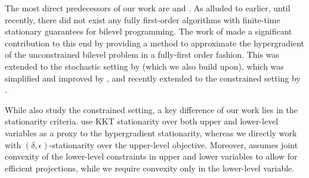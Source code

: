 The most direct predecessors of our work are \cite{liu2021value, kwon2023fully} and \cite{yao2024constrained, lu2024firstorder}. As alluded to earlier, until recently, there did not exist any fully first-order algorithms with finite-time stationary guarantees for bilevel programming. The work of \cite{liu2022bome} made a significant contribution to this end by providing a method to approximate the hypergradient of the unconstrained bilevel problem  in a fully-first order fashion. This was extended to the stochastic setting by \cite{kwon2023fully} (which we also build upon), which was simplified and improved by \cite{chen2023near}, and  recently extended to the constrained setting by \cite{yao2024constrained, lu2024firstorder}.

While \cite{yao2024constrained, lu2024firstorder} also study the constrained setting, a key difference of our work lies in the stationarity criteria. \cite{yao2024constrained, lu2024firstorder} use KKT stationarity over both upper and lower-level variables as a proxy to the hypergradient stationarity, whereas we directly work with $(\delta, \epsilon)$-stationarity over the upper-level objective.
Moreover, \cite{yao2024constrained} assumes joint convexity of the lower-level constraints in upper and lower variables to allow for efficient projections, 
while we require convexity only in the lower-level variable. 

